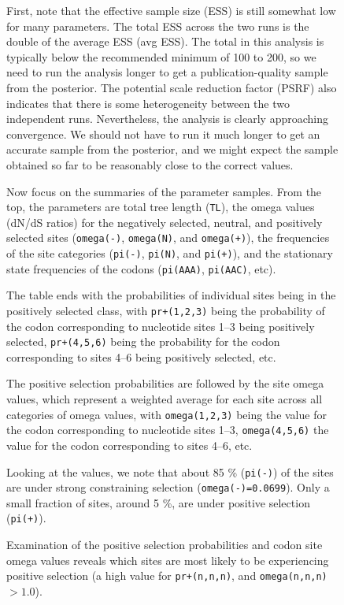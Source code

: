 \documentclass[12pt]{book}
\newcommand{\ttt}[1]{\texttt{#1}}
\begin{document}
\begin{figure}[h]
\begin{singlespacing}
\begin{verbatim}
\end{verbatim}
\normalsize
\end{singlespacing}

First, note that the effective sample size (ESS) is still somewhat low for many parameters. The
total ESS across the two runs is the double of the average ESS (avg ESS). The total in this
analysis is typically below the recommended minimum of 100 to 200, so we need to run the analysis
longer to get a publication-quality sample from the posterior. The potential scale reduction factor
(PSRF) also indicates that there is some heterogeneity between the two independent runs.
Nevertheless, the analysis is clearly approaching convergence. We should not have to run it much
longer to get an accurate sample from the posterior, and we might expect the sample obtained so far
to be reasonably close to the correct values.

Now focus on the summaries of the parameter samples. From the top, the parameters are total tree
length (\ttt{TL}), the omega values (dN/dS ratios) for the negatively selected, neutral, and
positively selected sites (\ttt{omega(-)}, \ttt{omega(N)}, and \ttt{omega(+)}), the frequencies of
the site categories (\ttt{pi(-)}, \ttt{pi(N)}, and \ttt{pi(+)}), and the stationary state
frequencies of the codons (\ttt{pi(AAA)}, \ttt{pi(AAC)}, etc).

The table ends with the probabilities of individual sites being in the positively selected class,
with \ttt{pr+(1,2,3)} being the probability of the codon corresponding to nucleotide sites 1--3
being positively selected, \ttt{pr+(4,5,6)} being the probability for the codon corresponding to
sites 4--6 being positively selected, etc.

The positive selection probabilities are followed by the site omega values, which represent a
weighted average for each site across all categories of omega values, with \ttt{omega(1,2,3)} being
the value for the codon corresponding to nucleotide sites 1--3, \ttt{omega(4,5,6)} the value for
the codon corresponding to sites 4--6, etc.

Looking at the values, we note that about 85 \% (\ttt{pi(-)}) of the sites are under strong
constraining selection (\ttt{omega(-)=0.0699}). Only a small fraction of sites, around 5 \%, are
under positive selection (\ttt{pi(+)}).

Examination of the positive selection probabilities and codon site omega values reveals which sites
are most likely to be experiencing positive selection (a high value for \ttt{pr+(n,n,n)}, and
\ttt{omega(n,n,n)} $> 1.0$).



\end{figure}
\end{document}
